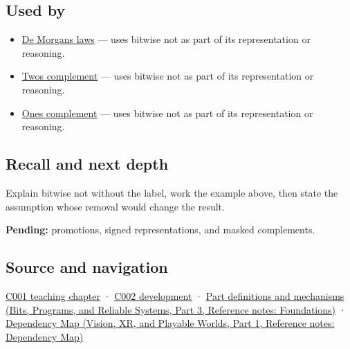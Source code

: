 \subsection{Used by}\label{appendix-8f38927cfc54-used-by}

\hypertarget{appendix-8f38927cfc54-used-by}{}

\begin{itemize}
\tightlist
\item
  \hyperref[appendix-9079d3659da4]{De Morgan\textquotesingle s laws} --- uses bitwise not as part of its representation or reasoning.
\item
  \hyperref[appendix-4fbc03d20829]{Two\textquotesingle s complement} --- uses bitwise not as part of its representation or reasoning.
\item
  \hyperref[appendix-03c678cd40b3]{One\textquotesingle s complement} --- uses bitwise not as part of its representation or reasoning.
\end{itemize}

\subsection{Recall and next depth}\label{appendix-8f38927cfc54-recall-and-next-depth}

\hypertarget{appendix-8f38927cfc54-recall-and-next-depth}{}

Explain bitwise not without the label, work the example above, then state the assumption whose removal would change the result.

\textbf{Pending:} promotions, signed representations, and masked complements.

\subsection{Source and navigation}\label{appendix-8f38927cfc54-source-and-navigation}

\hypertarget{appendix-8f38927cfc54-source-and-navigation}{}

\hyperref[01-foundations-i-ch001-from-a-signal-to-an-interpretation]{C001 teaching chapter} · \hyperref[01-foundations-i-ch001-arithmetic-becomes-a-policy]{C002 development} · \href{../01-Bits-Programs-and-Reliable-Systems-P03/main.pdf\#nameddest=appendix-fd090d982a15}{Part definitions and mechanisms (Bits, Programs, and Reliable Systems, Part 3, Reference notes: Foundations)} · \href{../07-Vision-XR-and-Playable-Worlds-P01/main.pdf\#nameddest=appendix-4ad47bdd269a}{Dependency Map (Vision, XR, and Playable Worlds, Part 1, Reference notes: Dependency Map)}
